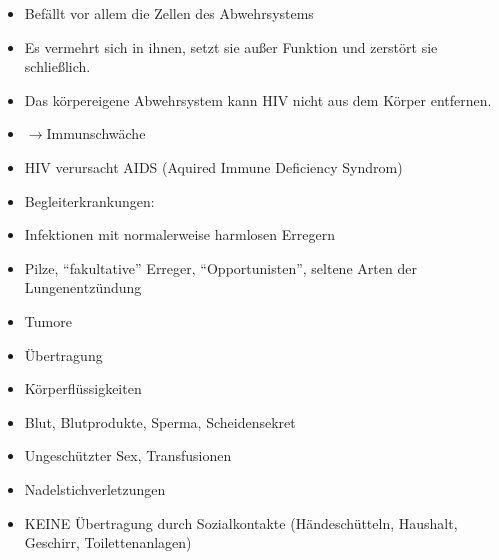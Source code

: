 \documentclass{article}
\begin{document}
\begin{itemize}
\item Bef\"allt vor allem die Zellen des Abwehrsystems 

\item Es vermehrt sich in ihnen, setzt sie au{\ss}er Funktion und
zerst\"ort sie schlie{\ss}lich.

\item Das k\"orpereigene Abwehrsystem kann HIV nicht aus dem K\"orper
entfernen.

\end{itemize}
\begin{itemize}
\item ${\rightarrow}$Immunschw\"ache

\end{itemize}
\begin{itemize}
\item HIV verursacht AIDS (Aquired Immune Deficiency Syndrom)

\item Begleiterkrankungen: 

\end{itemize}
\begin{itemize}
\item Infektionen mit normalerweise harmlosen Erregern

\end{itemize}
\begin{itemize}
\item Pilze, {\textquotedblleft}fakultative{\textquotedblright} Erreger,
{\textquotedblleft}Opportunisten{\textquotedblright}, seltene Arten der
Lungenentz\"undung

\end{itemize}
\begin{itemize}
\item Tumore

\end{itemize}
\begin{itemize}
\item \"Ubertragung

\end{itemize}
\begin{itemize}
\item K\"orperfl\"ussigkeiten

\item Blut, Blutprodukte, Sperma, Scheidensekret

\item Ungesch\"utzter Sex, Transfusionen

\item Nadelstichverletzungen

\item KEINE \"Ubertragung durch Sozialkontakte (H\"andesch\"utteln,
Haushalt, Geschirr, Toilettenanlagen)

\end{itemize}
\end{document}
